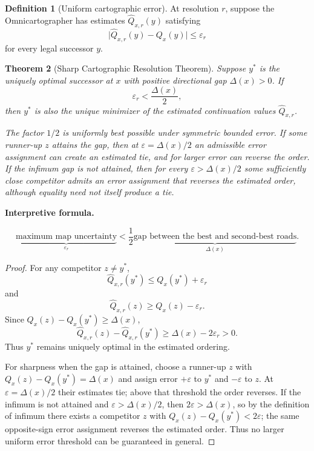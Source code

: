 \documentclass[11pt]{article}
\newtheorem{theorem}{Theorem}[section]
\theoremstyle{definition}
\newtheorem{definition}[theorem]{Definition}
\theoremstyle{remark}
\newcommand{\Qval}{Q}
\newcommand{\Gap}{\Delta}
\newcommand{\eps}{\varepsilon}
\newenvironment{interpretiveformula}{%
  \begin{center}\begin{minipage}{0.92\linewidth}\small
  \textbf{Interpretive formula.}\ \raggedright}{\end{minipage}\end{center}}
\begin{document}
\begin{definition}[Uniform cartographic error]
At resolution $r$, suppose the Omnicartographer has estimates $\widehat{\Qval}_{x,r}(y)$ satisfying
\[
\bigl|\widehat{\Qval}_{x,r}(y)-\Qval_x(y)\bigr|\le \eps_r
\]
for every legal successor $y$.
\end{definition}

\begin{theorem}[Sharp Cartographic Resolution Theorem]\label{thm:half-gap}
Suppose $y^*$ is the uniquely optimal successor at $x$ with positive directional gap $\Gap(x)>0$. If
\[
\boxed{\eps_r<\frac{\Gap(x)}{2}},
\]
then $y^*$ is also the unique minimizer of the estimated continuation values $\widehat{\Qval}_{x,r}$.

The factor $1/2$ is uniformly best possible under symmetric bounded error. If some runner-up $z$ attains the gap, then at $\eps=\Gap(x)/2$ an admissible error assignment can create an estimated tie, and for larger error can reverse the order. If the infimum gap is not attained, then for every $\eps>\Gap(x)/2$ some sufficiently close competitor admits an error assignment that reverses the estimated order, although equality need not itself produce a tie.
\end{theorem}

\begin{interpretiveformula}
\[
\underbrace{\text{maximum map uncertainty}}_{\eps_r}
<
\frac12\underbrace{\text{gap between the best and second-best roads}}_{\Gap(x)}.
\]
\end{interpretiveformula}

\begin{proof}
For any competitor $z\neq y^*$,
\[
\widehat{\Qval}_{x,r}(y^*)\le \Qval_x(y^*)+\eps_r
\]
and
\[
\widehat{\Qval}_{x,r}(z)\ge \Qval_x(z)-\eps_r.
\]
Since $\Qval_x(z)-\Qval_x(y^*)\ge\Gap(x)$,
\[
\widehat{\Qval}_{x,r}(z)-\widehat{\Qval}_{x,r}(y^*)
\ge \Gap(x)-2\eps_r>0.
\]
Thus $y^*$ remains uniquely optimal in the estimated ordering.

For sharpness when the gap is attained, choose a runner-up $z$ with $\Qval_x(z)-\Qval_x(y^*)=\Gap(x)$ and assign error $+\eps$ to $y^*$ and $-\eps$ to $z$. At $\eps=\Gap(x)/2$ their estimates tie; above that threshold the order reverses. If the infimum is not attained and $\eps>\Gap(x)/2$, then $2\eps>\Gap(x)$, so by the definition of infimum there exists a competitor $z$ with $\Qval_x(z)-\Qval_x(y^*)<2\eps$; the same opposite-sign error assignment reverses the estimated order. Thus no larger uniform error threshold can be guaranteed in general.
\end{proof}
\end{document}
